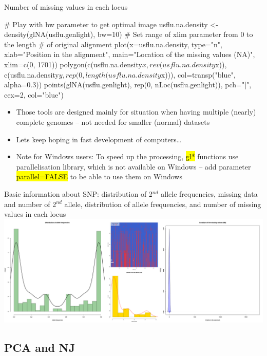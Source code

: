 \documentclass[compress, ucs, xelatex, 11pt, xcolor=svgnames,
  hyperref={
    bookmarks=true,
    unicode=true,
    colorlinks=true,
    pdftitle={Molecular data in R},
    plainpages=false,
    pdfauthor={Vojtech Zeisek},
    pdfsubject={Course about phylogeny and evolution in R},
    pdfcreator={XeLaTeX},
    pdfkeywords={R, evolution, phylogeny, molecular data},
    linkcolor=Tomato,
    anchorcolor=SaddleBrown,
    citecolor=Goldenrod,
    filecolor=DarkMagenta,
    menucolor=Sienna,
    urlcolor=DarkTurquoise,
    pdftex},
  url={hyphens, lowtilde} %
  ]{beamer}
\renewcommand{\texttt}[1]{\hl{\ttfamily #1}}
\begin{document}
\begin{frame}[fragile]{Number of missing values in each locus}
  \begin{spluscode}
    # Play with bw parameter to get optimal image
    usflu.na.density <- density(glNA(usflu.genlight), bw=10)
    # Set range of xlim parameter from 0 to the length
    # of original alignment
    plot(x=usflu.na.density, type="n", xlab="Position in the alignment",
      main="Location of the missing values (NA)", xlim=c(0, 1701))
    polygon(c(usflu.na.density$x, rev(usflu.na.density$x)),
      c(usflu.na.density$y, rep(0, length(usflu.na.density$x))),
      col=transp("blue", alpha=0.3))
    points(glNA(usflu.genlight), rep(0, nLoc(usflu.genlight)), 
      pch="|", cex=2, col="blue")
  \end{spluscode}
  \begin{itemize}
    \item Those tools are designed mainly for situation when having multiple (nearly) complete genomes -- not needed for smaller (normal) datasets
    \item Lets keep hoping in fast development of computers\ldots
    \item \alert{Note for Windows users:} To speed up the processing, \texttt{gl*} functions use parallelisation library, which is not available on Windows -- add parameter \texttt{parallel=FALSE} to be able to use them on Windows
  \end{itemize}
\end{frame}

\begin{frame}{Basic information about SNP: distribution of 2$^{nd}$ allele frequencies, missing data and number of 2$^{nd}$ allele, distribution of allele frequencies, and number of missing values in each locus}
\includegraphics[width=\textwidth]{flu_alleles.png}
\end{frame}

\subsection{PCA and NJ}
\end{document}
